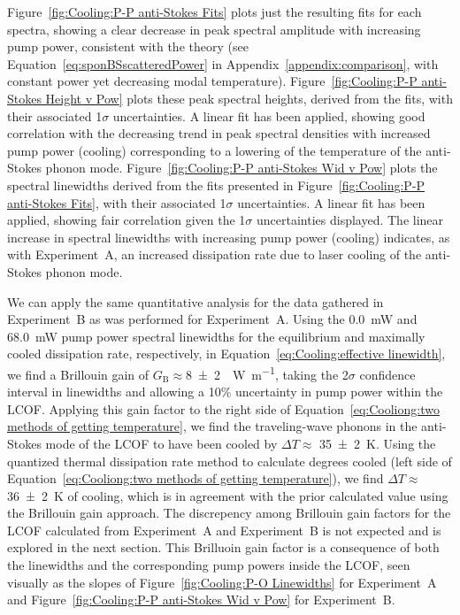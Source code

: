 Figure~\ref{fig:Cooling:P-P anti-Stokes Fits} plots just the resulting fits for each spectra, showing a clear decrease in peak spectral amplitude with increasing pump power, consistent with the theory (see Equation~\ref{eq:sponBSscatteredPower} in Appendix~\ref{appendix:comparison}, with constant power yet decreasing modal temperature). Figure~\ref{fig:Cooling:P-P anti-Stokes Height v Pow} plots these peak spectral heights, derived from the fits, with their associated 1\(\sigma\) uncertainties. A linear fit has been applied, showing good correlation with the decreasing trend in peak spectral densities with increased pump power (cooling) corresponding to a lowering of the temperature of the anti-Stokes phonon mode. Figure~\ref{fig:Cooling:P-P anti-Stokes Wid v Pow} plots the spectral linewidths derived from the fits presented in Figure~\ref{fig:Cooling:P-P anti-Stokes Fits}, with their associated 1\(\sigma\) uncertainties. A linear fit has been applied, showing fair correlation given the 1\(\sigma\) uncertainties displayed. The linear increase in spectral linewidths with increasing pump power (cooling) indicates, as with Experiment~A, an increased dissipation rate due to laser cooling of the anti-Stokes phonon mode.

We can apply the same quantitative analysis for the data gathered in Experiment~B as was performed for Experiment~A. Using the \SI{0.0}{\milli\watt} and \SI{68.0}{\milli\watt} pump power spectral linewidths for the equilibrium and maximally cooled dissipation rate, respectively, in Equation~\ref{eq:Cooling:effective linewidth}, we find a Brillouin gain of \(G_{\mathrm{B}} \approx \)\SI{8(2)}{\per\watt\per\meter}, taking the 2\(\sigma\) confidence interval in linewidths and allowing a 10\% uncertainty in pump power within the \ac{LCOF}. Applying this gain factor to the right side of Equation~\ref{eq:Cooliong:two methods of getting temperature}, we find the traveling-wave phonons in the anti-Stokes mode of the \ac{LCOF} to have been cooled by \(\Delta T\approx\) \SI{35(2)}{\kelvin}. Using the quantized thermal dissipation rate method to calculate degrees cooled (left side of Equation~\ref{eq:Cooliong:two methods of getting temperature}), we find \(\Delta T \approx\)\SI{36(2)}{\kelvin} of cooling, which is in agreement with the prior calculated value using the Brillouin gain approach. The discrepency among Brillouin gain factors for the \ac{LCOF} calculated from Experiment~A and Experiment~B is not expected and is explored in the next section. This Brilluoin gain factor is a consequence of both the linewidths and the corresponding pump powers inside the \ac{LCOF}, seen visually as the slopes of Figure~\ref{fig:Cooling:P-O Linewidths} for Experiment~A and Figure~\ref{fig:Cooling:P-P anti-Stokes Wid v Pow} for Experiment~B.

